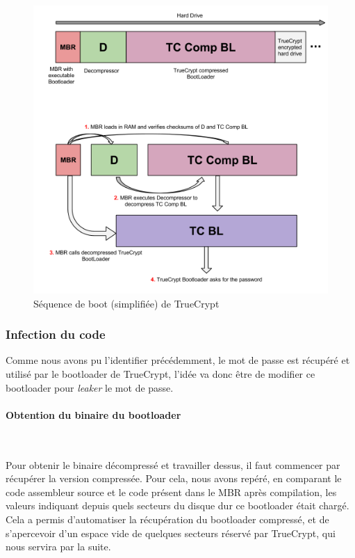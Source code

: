 \documentclass[12pt,a4paper]{article}
\begin{document}
\begin{figure}[H]
    \centering
    \includegraphics[height=0.5\textheight]{img/tc_boot.png}
    \caption{Séquence de boot (simplifiée) de TrueCrypt}
    \label{tc_boot}
\end{figure}

\subsubsection{Infection du code}

Comme nous avons pu l'identifier précédemment, le mot de passe est récupéré et
utilisé par le bootloader de TrueCrypt, l'idée va donc être de modifier ce
bootloader pour \textit{leaker} le mot de passe.

\paragraph{Obtention du binaire du bootloader}~

Pour obtenir le binaire décompressé et travailler dessus, il faut commencer par
récupérer la version compressée. Pour cela, nous avons repéré, en comparant
le code assembleur source et le code présent dans le MBR après compilation,
les valeurs indiquant depuis quels secteurs du disque dur ce bootloader était
chargé. Cela a permis d'automatiser la récupération du bootloader compressé,
et de s'apercevoir d'un espace vide de quelques secteurs réservé par TrueCrypt,
qui nous servira par la suite.
\end{document}
